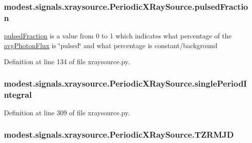 \subsubsection[{\texorpdfstring{pulsed\+Fraction}{pulsedFraction}}]{\setlength{\rightskip}{0pt plus 5cm}modest.\+signals.\+xraysource.\+Periodic\+X\+Ray\+Source.\+pulsed\+Fraction}\hypertarget{classmodest_1_1signals_1_1xraysource_1_1PeriodicXRaySource_a5f968d9c80e5315d1657eac2ffca4e73}{}\label{classmodest_1_1signals_1_1xraysource_1_1PeriodicXRaySource_a5f968d9c80e5315d1657eac2ffca4e73}


\hyperlink{classmodest_1_1signals_1_1xraysource_1_1PeriodicXRaySource_a5f968d9c80e5315d1657eac2ffca4e73}{pulsed\+Fraction} is a value from 0 to 1 which indicates what percentage of the \hyperlink{classmodest_1_1signals_1_1xraysource_1_1PeriodicXRaySource_ac227ebef6424695360f2771765b4a4a7}{avg\+Photon\+Flux} is \char`\"{}pulsed\char`\"{} and what percentage is constant/background 



Definition at line 134 of file xraysource.\+py.

\subsubsection[{\texorpdfstring{single\+Period\+Integral}{singlePeriodIntegral}}]{\setlength{\rightskip}{0pt plus 5cm}modest.\+signals.\+xraysource.\+Periodic\+X\+Ray\+Source.\+single\+Period\+Integral}\hypertarget{classmodest_1_1signals_1_1xraysource_1_1PeriodicXRaySource_ab193c1d52a5bd8b0798bf407abcca72d}{}\label{classmodest_1_1signals_1_1xraysource_1_1PeriodicXRaySource_ab193c1d52a5bd8b0798bf407abcca72d}


Definition at line 309 of file xraysource.\+py.

\subsubsection[{\texorpdfstring{T\+Z\+R\+M\+JD}{TZRMJD}}]{\setlength{\rightskip}{0pt plus 5cm}modest.\+signals.\+xraysource.\+Periodic\+X\+Ray\+Source.\+T\+Z\+R\+M\+JD}\hypertarget{classmodest_1_1signals_1_1xraysource_1_1PeriodicXRaySource_aecd53533d34a4f821f4010c197edc2e8}{}\label{classmodest_1_1signals_1_1xraysource_1_1PeriodicXRaySource_aecd53533d34a4f821f4010c197edc2e8}


